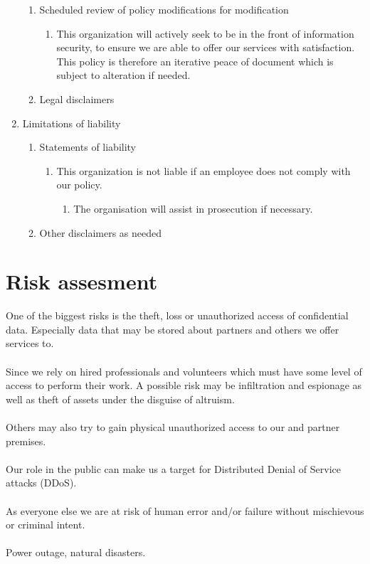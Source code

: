 \begin{enumerate}
  \begin{enumerate}
    \item Scheduled review of policy modifications for modification
    \begin{enumerate}
      \item This organization will actively seek to be in the front of information security, to ensure we are able to offer our services with satisfaction. This policy is therefore an iterative peace of document which is subject to alteration if needed.
    \end{enumerate}
    \item Legal disclaimers
  \end{enumerate}
  \item Limitations of liability
  \begin{enumerate}
    \item Statements of liability
    \begin{enumerate}
      \item This organization is not liable if an employee does not comply with our policy.
      \begin{enumerate}
        \item The organisation will assist in prosecution if necessary.
      \end{enumerate}
    \end{enumerate}
    \item Other disclaimers as needed
  \end{enumerate}
\end{enumerate}


\section{Risk assesment}


One of the biggest risks is the theft, loss or unauthorized access of confidential data. Especially data that may be stored about partners and others we offer services to.
\\
\\
Since we rely on hired professionals and volunteers which must have some level of access to perform their work. A possible risk may be infiltration and espionage as well as theft of assets under the disguise of altruism.
\\
\\
Others may also try to gain physical unauthorized access to our and partner premises.
\\
\\
Our role in the public can make us a target for Distributed Denial of Service attacks (DDoS).
\\
\\
As everyone else we are at risk of human error and/or failure without mischievous or criminal intent. 
\\
\\
Power outage, natural disasters.

